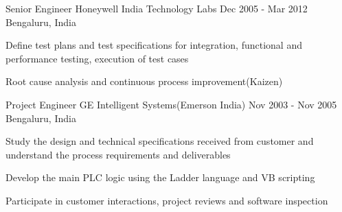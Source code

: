 \documentclass[11pt, a4paper]{awesome-cv}
\begin{document}
\begin{cventries}
    \cventry
      {Senior Engineer}
      {Honeywell India Technology Labs}
      {Dec 2005 - Mar 2012}
      {Bengaluru, India}
      {
        \begin{cvitems}
        \item Define test plans and test specifications for integration, functional and performance testing, execution of test cases
        \item Root cause analysis and continuous process improvement(Kaizen)
        \end{cvitems}
      }

    \cventry
      {Project Engineer}
      {GE Intelligent Systems(Emerson India)}
      {Nov 2003 - Nov 2005}
      {Bengaluru, India}
      {
        \begin{cvitems}
        \item Study the design and technical specifications received from customer and understand the process requirements and deliverables
        \item Develop the main PLC logic using the Ladder language and VB scripting
        \item Participate in customer interactions, project reviews and software inspection
        \end{cvitems}
      }
  \end{cventries}

\end{document}
